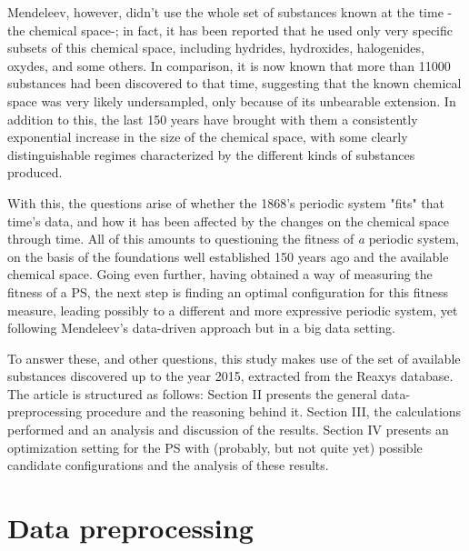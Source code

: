 \documentclass[]{article}
\begin{document}
Mendeleev, however, didn't use the whole set of substances known at the time -the chemical space-; in fact, it has been reported that he used only very specific subsets of this chemical space, including hydrides, hydroxides, halogenides, oxydes, and some others. In comparison, it is now known that more than 11000 substances had been discovered to that time, suggesting that the known chemical space was very likely undersampled, only because of its unbearable extension. In addition to this, the last 150 years have brought with them a consistently exponential increase in the size of the chemical space, with some clearly distinguishable regimes characterized by the different kinds of substances produced. 

With this, the questions arise of whether the 1868's periodic system "fits" that time's data, and how it has been affected by the changes on the chemical space through time. All of this amounts to questioning the fitness of \textit{a} periodic system, on the basis of the foundations well established 150 years ago and the available chemical space. Going even further, having obtained a way of measuring the fitness of a PS, the next step is finding an optimal configuration for this fitness measure, leading possibly to a different and more expressive periodic system, yet following Mendeleev's data-driven approach but in a big data setting.

To answer these, and other questions, this study makes use of the set of available substances discovered up to the year 2015, extracted from the Reaxys database. The article is structured as follows: Section II presents the general data-preprocessing procedure and the reasoning behind it. Section III, the calculations performed and an analysis and discussion of the results. Section IV presents an optimization setting for the PS with (probably, but not quite yet) possible candidate configurations and the analysis of these results.

\section{Data preprocessing}
\label{sec:sec2}
\end{document}

